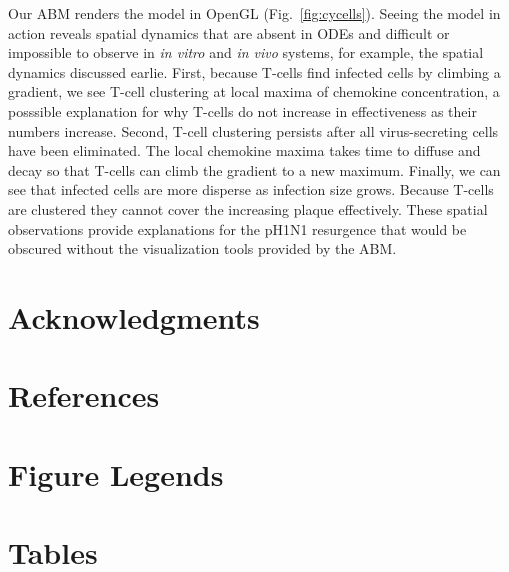 \documentclass[10pt]{article}
\begin{document}
Our ABM renders the model in OpenGL (Fig.~\ref{fig:cycells}).  Seeing the model in action reveals spatial dynamics that are absent in ODEs and difficult or impossible to observe in \textit{in vitro} and \textit{in vivo} systems, for example, the spatial dynamics discussed earlie.  First, because T-cells find infected cells by climbing a gradient, we see T-cell clustering at local maxima of chemokine concentration, a posssible explanation for why T-cells do not increase in effectiveness as their numbers increase.   Second, T-cell clustering persists after all virus-secreting cells have been eliminated.  The local chemokine maxima takes time to diffuse and decay so that T-cells can climb the gradient to a new maximum.  Finally, we can see that infected cells are more disperse as infection size grows.  Because T-cells are clustered they cannot cover the increasing plaque effectively.  These spatial observations provide explanations for the pH1N1 resurgence that would be obscured without the visualization tools provided by the ABM.

\section*{Acknowledgments}


\section*{References}


\section*{Figure Legends}


\section*{Tables}
\end{document}
